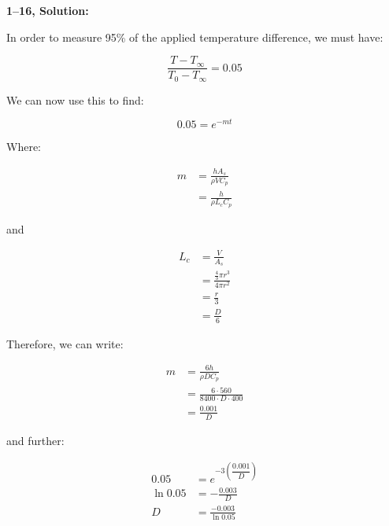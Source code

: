 \documentclass[letterpaper,12pt]{article}
\begin{document}
\vspace{6pt}

\textbf{1--16, Solution:}

In order to measure 95\% of the applied temperature difference, we must have:

\begin{equation}
    \frac{T - T_{\infty}}{T_0 - T_{\infty}} = 0.05
\end{equation}

We can now use this to find:

\begin{equation}
    0.05 = e^{-mt}
\end{equation}

Where:

\begin{equation}
\begin{aligned}
    m &= \frac{h A_s}{\rho V C_p} \\
      &= \frac{h}{\rho L_c C_p}
\end{aligned}
\end{equation}

and 

\begin{equation}
\begin{aligned}
    L_c &= \frac{V}{A_s} \\
        &= \frac{\frac{4}{3}\pi r^3}{4 \pi r^2} \\
        &= \frac{r}{3} \\
        &= \frac{D}{6}
\end{aligned}
\end{equation}

Therefore, we can write:

\begin{equation}
\begin{aligned}
    m &= \frac{6 h}{\rho D C_p} \\
      &= \frac{6 \cdot 560}{8400 \cdot D \cdot 400} \\
      &= \frac{0.001}{D}
\end{aligned}
\end{equation}

and further:

\begin{equation}
\begin{aligned}
    0.05      &= e^{-3\left(\dfrac{0.001}{D}\right)} \\
    \ln{0.05} &= - \frac{0.003}{D} \\
    D         &= \frac{-0.003}{\ln{0.05}}
\end{aligned}
\end{equation}
\end{document}
